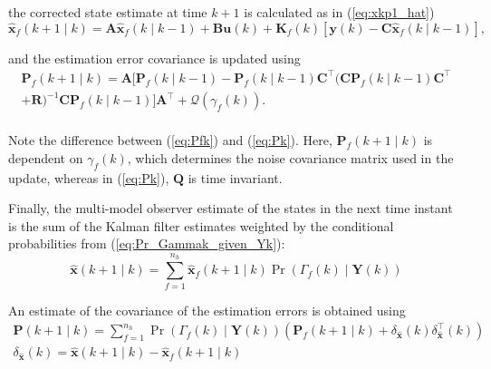 the corrected state estimate at time $k+1$ is calculated as in (\ref{eq:xkp1_hat})
\begin{equation} \label{eq:xfkp1_hat}
	\mathbf{\hat{x}}_f(k+1 \mid k) = \mathbf{A} \mathbf{\hat{x}}_f(k \mid k-1) + \mathbf{B}\mathbf{u}(k) + 
	\mathbf{K}_f(k)\left[\mathbf{y}(k)-\mathbf{C} \mathbf{\hat{x}}_f(k \mid k-1)\right],
\end{equation}

and the estimation error covariance is updated using
\begin{multline} \label{eq:Pfk}
	\mathbf{P}_f(k+1 \mid k) = \mathbf{A}\big[\mathbf{P}_f(k \mid k-1)
	- \mathbf{P}_f(k \mid k-1)\mathbf{C}^\intercal\big(\mathbf{C}\mathbf{P}_f(k \mid k-1)\mathbf{C}^\intercal \\ + 
	\mathbf{R}\big)^{-1}\mathbf{C}\mathbf{P}_f(k \mid k-1) \big]\mathbf{A}^\intercal + \mathcal{Q}(\gamma_f(k)). \\
\end{multline}

Note the difference between (\ref{eq:Pfk}) and (\ref{eq:Pk}).  Here, $\mathbf{P}_f(k+1 \mid k)$ is dependent on $\gamma_f(k)$, which determines the noise covariance matrix used in the update, whereas in (\ref{eq:Pk}), $\mathbf{Q}$ is time invariant.

Finally, the multi-model observer estimate of the states in the next time instant is the sum of the Kalman filter estimates weighted by the conditional probabilities from (\ref{eq:Pr_Gammak_given_Yk}):
\begin{equation} \label{eq:x_hat}
	\mathbf{\hat{x}}(k+1 \mid k) = \sum_{f=1}^{n_h} \mathbf{\hat{x}}_f(k+1 \mid k) \Pr(\Gamma_f(k) \mid \mathbf{Y}(k))
\end{equation}

An estimate of the covariance of the estimation errors is obtained using
\begin{equation} \label{eq:P_hat}
	\begin{aligned}
	\mathbf{P}(k+1 \mid k) = \sum_{f=1}^{n_h} \Pr(\Gamma_f(k) \mid \mathbf{Y}(k)) \left( \mathbf{P}_f(k+1 \mid k) + \delta_\mathbf{\hat{x}}(k) \delta_\mathbf{\hat{x}}^\intercal(k) \right) \\
	\delta_\mathbf{\hat{x}}(k) = \mathbf{\hat{x}}(k+1 \mid k) - \mathbf{\hat{x}}_f(k+1 \mid k)
	\end{aligned}
\end{equation}


